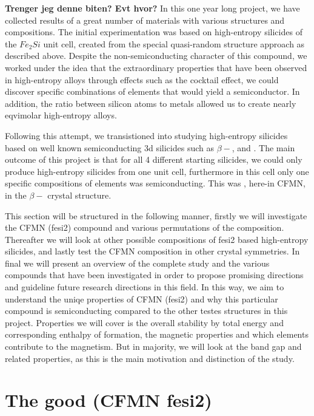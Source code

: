 \textbf{Trenger jeg denne biten? Evt hvor?}
In this one year long project, we have collected results of a great number of materials with various structures and compositions. The initial experimentation was based on high-entropy silicides of the $Fe_2Si$ unit cell, created from the special quasi-random structure approach as described above. Despite the non-semiconducting character of this compound, we worked under the idea that the extraordinary properties that have been observed in high-entropy alloys through effects such as the cocktail effect, we could discover specific combinations of elements that would yield a semiconductor. In addition, the ratio between silicon atoms to metals allowed us to create nearly eqvimolar high-entropy alloys. 

Following this attempt, we transistioned into studying high-entropy silicides based on well known semiconducting 3d silicides such as $\beta-$,  and . The main outcome of this project is that for all 4 different starting silicides, we could only produce high-entropy silicides from one unit cell, furthermore in this cell only one specific compositions of elements was semiconducting. This was , here-in CFMN, in the $\beta-$  crystal structure.  

This section will be structured in the following manner, firstly we will investigate the CFMN (fesi2) compound and various permutations of the composition. Thereafter we will look at other possible compositions of fesi2 based high-entropy silicides, and lastly test the CFMN composition in other crystal symmetries. In final we will present an overview of the complete study and the various compounds that have been investigated in order to propose promising directions and guideline future research directions in this field. In this way, we aim to understand the uniqe properties of CFMN (fesi2) and why this particular compound is semiconducting compared to the other testes structures in this project. Properties we will cover is the overall stability by total energy and corresponding enthalpy of formation, the magnetic properties and which elements contribute to the magnetism. But in majority, we will look at the band gap and related properties, as this is the main motivation and distinction of the study.    

\chapter{The good (CFMN fesi2)}
\label{sec:good}

